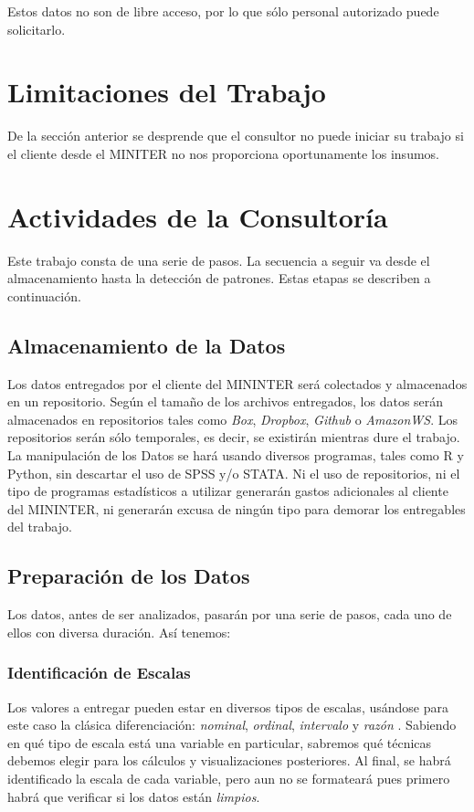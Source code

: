\documentclass{article}
\begin{document}
Estos datos no son de libre acceso, por lo que s\'{o}lo personal autorizado puede solicitarlo.

\section{Limitaciones del Trabajo}

De la secci\'{o}n anterior se desprende que el consultor no puede iniciar su trabajo si el cliente desde el MINITER no nos proporciona oportunamente los insumos.

\section{Actividades de la Consultor\'{i}a}

Este trabajo consta de una serie de pasos. La secuencia a seguir va desde el almacenamiento hasta la detección de patrones\cite{magallanes_reyes_introducing_2017}. Estas etapas se describen a continuación.

\subsection{Almacenamiento de la Datos}

Los datos entregados por el cliente del MININTER será colectados y almacenados en un repositorio. Según el tamaño de los archivos entregados, los datos serán almacenados en repositorios tales como \emph{Box}, \emph{Dropbox}, \emph{Github} o \emph{AmazonWS}. Los repositorios serán sólo temporales, es decir, se existirán mientras dure el trabajo. La manipulación de los Datos se hará usando diversos programas, tales como R y Python, sin descartar el uso de SPSS y/o STATA. Ni el uso de repositorios, ni el tipo de programas estadísticos a utilizar generarán gastos adicionales al cliente del MININTER, ni generarán excusa de ningún tipo para demorar los entregables del trabajo.

\subsection{Preparación de los Datos}

Los datos, antes de ser analizados, pasarán por una serie de pasos, cada uno de ellos con diversa duración. Así tenemos:

\subsubsection{Identificación de Escalas}
Los valores a entregar pueden estar en diversos tipos de escalas, usándose para este caso la clásica diferenciación: \emph{nominal}, \emph{ordinal}, \emph{intervalo} y \emph{razón} \cite{stevens_theory_1946}. Sabiendo en qué tipo de escala está una variable en particular, sabremos qué técnicas debemos elegir para los cálculos y visualizaciones posteriores. Al final, se habrá identificado la escala de cada variable, pero aun no se formateará pues primero habrá que verificar si los datos están \emph{limpios}.
\end{document}
